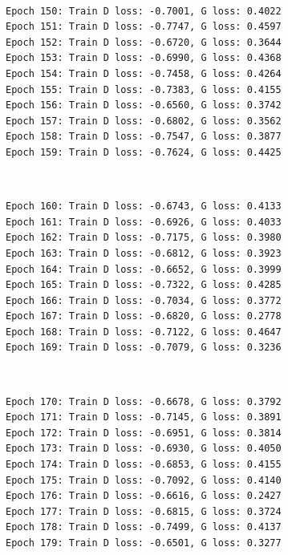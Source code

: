 \documentclass[11pt]{article}
\begin{document}
    \begin{center}
    \end{center}
    { \hspace*{\fill} \\}
    
    \begin{Verbatim}[commandchars=\\\{\}]
Epoch 150: Train D loss: -0.7001, G loss: 0.4022
Epoch 151: Train D loss: -0.7747, G loss: 0.4597
Epoch 152: Train D loss: -0.6720, G loss: 0.3644
Epoch 153: Train D loss: -0.6990, G loss: 0.4368
Epoch 154: Train D loss: -0.7458, G loss: 0.4264
Epoch 155: Train D loss: -0.7383, G loss: 0.4155
Epoch 156: Train D loss: -0.6560, G loss: 0.3742
Epoch 157: Train D loss: -0.6802, G loss: 0.3562
Epoch 158: Train D loss: -0.7547, G loss: 0.3877
Epoch 159: Train D loss: -0.7624, G loss: 0.4425

    \end{Verbatim}

    \begin{center}
    \end{center}
    { \hspace*{\fill} \\}
    
    \begin{Verbatim}[commandchars=\\\{\}]
Epoch 160: Train D loss: -0.6743, G loss: 0.4133
Epoch 161: Train D loss: -0.6926, G loss: 0.4033
Epoch 162: Train D loss: -0.7175, G loss: 0.3980
Epoch 163: Train D loss: -0.6812, G loss: 0.3923
Epoch 164: Train D loss: -0.6652, G loss: 0.3999
Epoch 165: Train D loss: -0.7322, G loss: 0.4285
Epoch 166: Train D loss: -0.7034, G loss: 0.3772
Epoch 167: Train D loss: -0.6820, G loss: 0.2778
Epoch 168: Train D loss: -0.7122, G loss: 0.4647
Epoch 169: Train D loss: -0.7079, G loss: 0.3236

    \end{Verbatim}

    \begin{center}
    \end{center}
    { \hspace*{\fill} \\}
    
    \begin{Verbatim}[commandchars=\\\{\}]
Epoch 170: Train D loss: -0.6678, G loss: 0.3792
Epoch 171: Train D loss: -0.7145, G loss: 0.3891
Epoch 172: Train D loss: -0.6951, G loss: 0.3814
Epoch 173: Train D loss: -0.6930, G loss: 0.4050
Epoch 174: Train D loss: -0.6853, G loss: 0.4155
Epoch 175: Train D loss: -0.7092, G loss: 0.4140
Epoch 176: Train D loss: -0.6616, G loss: 0.2427
Epoch 177: Train D loss: -0.6815, G loss: 0.3724
Epoch 178: Train D loss: -0.7499, G loss: 0.4137
Epoch 179: Train D loss: -0.6501, G loss: 0.3277

    \end{Verbatim}
\end{document}

